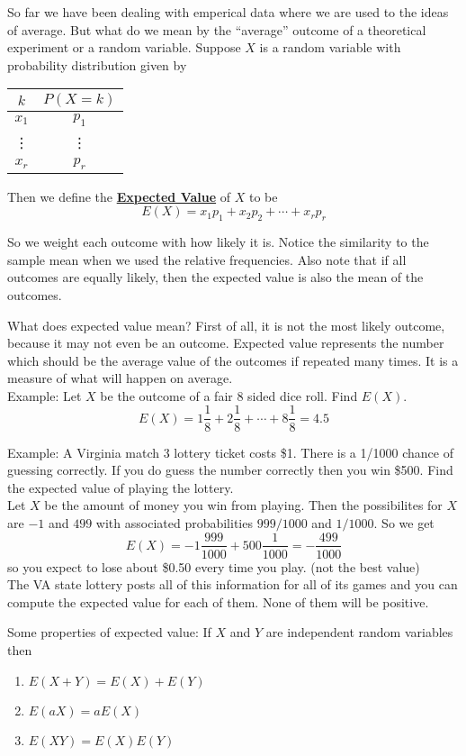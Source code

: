 \documentclass[14,fleqn]{article}
\newcommand{\defn}[1]{\textbf{\underline{#1}}}
\begin{document}
So far we have been dealing with emperical data where we are used to the ideas of average. But what do we mean by the ``average'' outcome of a theoretical experiment or a random variable. Suppose $X$ is a random variable with probability distribution given by
\begin{tabular}{c|c}
	$k$&$P(X=k)$\\\hline
	$x_1$&$p_1$\\
	\vdots&\vdots\\
	$x_r$&$p_r$\\
\end{tabular}

Then we define the \defn{Expected Value} of $X$ to be
\[
	E(X)=x_1p_1+x_2p_2+\cdots +x_rp_r
\]

So we weight each outcome with how likely it is. Notice the similarity to the sample mean when we used the relative frequencies. Also note that if all outcomes are equally likely, then the expected value is also the mean of the outcomes. 

What does expected value mean? First of all, it is not the most likely outcome, because it may not even be an outcome. Expected value represents the number which should be the average value of the outcomes if repeated many times. It is a measure of what will happen on average.\\

Example: Let $X$ be the outcome of a fair 8 sided dice roll. Find $E(X).$
\[
	E(X)=1\frac{1}{8}+2\frac{1}{8}+\cdots +8\frac{1}{8}=4.5
\]


Example: A Virginia match 3 lottery ticket costs \$1. There is a 1/1000 chance of guessing correctly. If you do guess the number correctly then you win \$500. Find the expected value of playing the lottery.\\

Let $X$ be the amount of money you win from playing. Then the possibilites for $X$ are $-1$ and $499$ with associated probabilities $999/1000$ and $1/1000.$ So we get
\[
	E(X)=-1\frac{999}{1000}+500\frac{1}{1000}=-\frac{499}{1000}
\]
so you expect to lose about \$0.50 every time you play. (not the best value)\\

The VA state lottery posts all of this information for all of its games and you can compute the expected value for each of them. None of them will be positive.

Some properties of expected value: If $X$ and $Y$ are independent random variables then
\begin{enumerate}
	\item $E(X+Y)=E(X)+E(Y)$
	\item $E(aX)=aE(X)$
	\item $E(XY)=E(X)E(Y)$
\end{enumerate}
\end{document}
